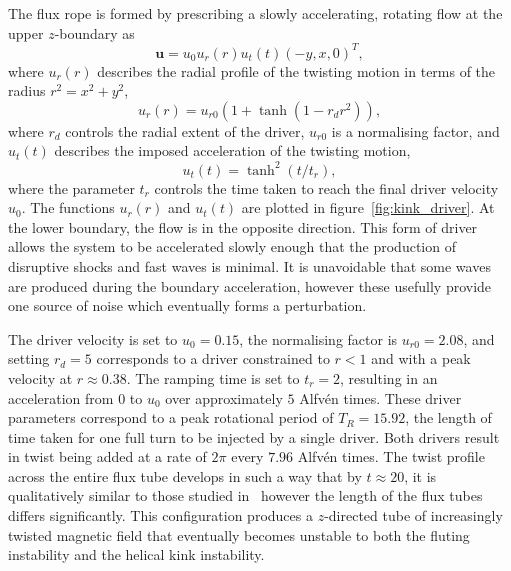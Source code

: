 \documentclass[12pt]{article}
\renewcommand{\vec}[1]{{\bm #1}}
\begin{document}
The flux rope is formed by prescribing a slowly accelerating, rotating flow at the upper $z$-boundary as
\begin{equation}
  \label{eq:null_twisting_profile}
  \vec{u} = u_0 u_r(r) u_t(t) (-y, x, 0)^T,
\end{equation}
where $u_r(r)$ describes the radial profile of the twisting motion in terms of the radius $r^2 = x^2 + y^2$,
\begin{equation}
  \label{eq:radial_twisting_function}
  u_r(r) = u_{r0}(1 + \tanh(1 - r_d r^2)),
\end{equation}
where $r_d$ controls the radial extent of the driver, $u_{r0}$ is a normalising factor, and $u_t(t)$ describes the imposed acceleration of the twisting motion,
\begin{equation}
  \label{eq:ramping_up_function}
  u_t(t) = \tanh^2(t/t_r),
\end{equation}
where the parameter $t_r$ controls the time taken to reach the final driver velocity $u_0$. The functions $u_r(r)$ and $u_t(t)$ are plotted in figure~\ref{fig:kink_driver}. At the lower boundary, the flow is in the opposite direction. This form of driver allows the system to be accelerated slowly enough that the production of disruptive shocks and fast waves is minimal. It is unavoidable that some waves are produced during the boundary acceleration, however these usefully provide one source of noise which eventually forms a perturbation.

The driver velocity is set to $u_0 = 0.15$, the normalising factor is $u_{r0} = 2.08$, and setting $r_d = 5$ corresponds to a driver constrained to $r<1$ and with a peak velocity at $r\approx 0.38$. The ramping time is set to $t_r = 2$, resulting in an acceleration from $0$ to $u_0$ over approximately $5$ Alfv\'en times. These driver parameters correspond to a peak rotational period of $T_R = 15.92$, the length of time taken for one full turn to be injected by a single driver. Both drivers result in twist being added at a rate of $2\pi$ every $7.96$ Alfv\'en times. The twist profile across the entire flux tube develops in such a way that by $t\approx 20$, it is qualitatively similar to those studied in~\cite{quinnEffectAnisotropicViscosity2020a,hoodCoronalHeatingMagnetic2009,barefordShockHeatingNumerical2015} however the length of the flux tubes differs significantly. This configuration produces a $z$-directed tube of increasingly twisted magnetic field that eventually becomes unstable to both the fluting instability and the helical kink instability.
\end{document}
